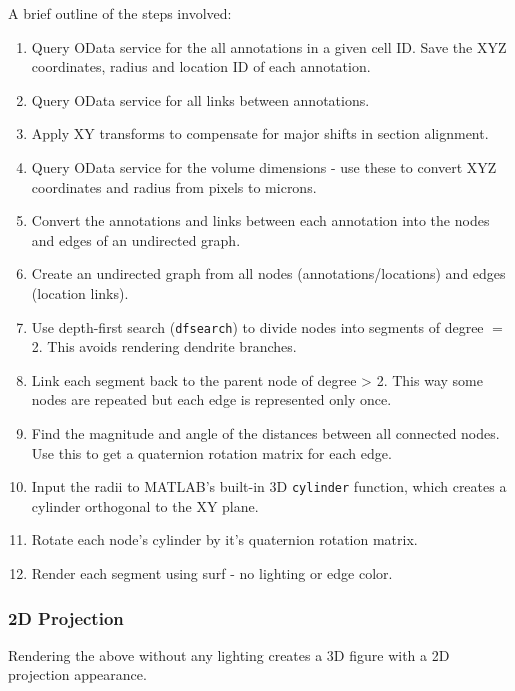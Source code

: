 \documentclass[12pt]{exam}
\begin{document}
	A brief outline of the steps involved:
	\begin{enumerate}
		\item Query OData service for the all annotations in a given cell ID. Save the XYZ coordinates, radius and location ID of each annotation. 
		\item Query OData service for all links between annotations.
		\item Apply XY transforms to compensate for major shifts in section alignment.
		\item Query OData service for the volume dimensions - use these to convert XYZ coordinates and radius from pixels to microns.
		\item Convert the annotations and links between each annotation into the nodes and edges of an undirected graph.
		\item Create an undirected graph from all nodes (annotations/locations) and edges (location links).
		\item Use depth-first search (\texttt{dfsearch}) to divide nodes into segments of degree $=$ 2. This avoids rendering dendrite branches.
		\item Link each segment back to the parent node of degree > 2. This way some nodes are repeated but each edge is represented only once.
		\item Find the magnitude and angle of the distances between all connected nodes. Use this to get a quaternion rotation matrix for each edge.
		\item Input the radii to MATLAB's built-in 3D \texttt{cylinder} function, which creates a cylinder orthogonal to the XY plane.
		\item Rotate each node's cylinder by it's quaternion rotation matrix.
		\item Render each segment using surf - no lighting or edge color.
	\end{enumerate}
	\subsubsection{2D Projection}
	Rendering the above without any lighting creates a 3D figure with a 2D projection appearance.
\end{document}
